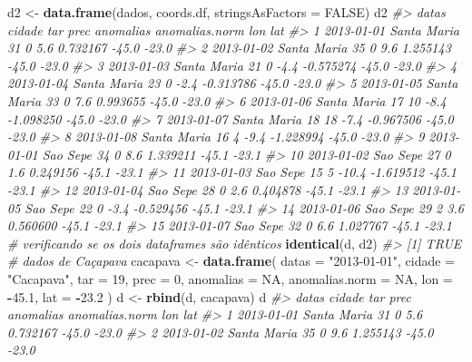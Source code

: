 \documentclass[]{book}
\newenvironment{Shaded}{\begin{snugshade}}{\end{snugshade}}
\newcommand{\KeywordTok}[1]{\textcolor[rgb]{0.13,0.29,0.53}{\textbf{#1}}}
\newcommand{\DataTypeTok}[1]{\textcolor[rgb]{0.13,0.29,0.53}{#1}}
\newcommand{\DecValTok}[1]{\textcolor[rgb]{0.00,0.00,0.81}{#1}}
\newcommand{\FloatTok}[1]{\textcolor[rgb]{0.00,0.00,0.81}{#1}}
\newcommand{\StringTok}[1]{\textcolor[rgb]{0.31,0.60,0.02}{#1}}
\newcommand{\CommentTok}[1]{\textcolor[rgb]{0.56,0.35,0.01}{\textit{#1}}}
\newcommand{\OtherTok}[1]{\textcolor[rgb]{0.56,0.35,0.01}{#1}}
\newcommand{\OperatorTok}[1]{\textcolor[rgb]{0.81,0.36,0.00}{\textbf{#1}}}
\newcommand{\NormalTok}[1]{#1}
\begin{document}
\begin{Shaded}
\begin{Highlighting}[]
\NormalTok{d2 <-}\StringTok{ }\KeywordTok{data.frame}\NormalTok{(dados, coords.df, }\DataTypeTok{stringsAsFactors =} \OtherTok{FALSE}\NormalTok{)}
\NormalTok{d2}
\CommentTok{#>         datas      cidade tar prec anomalias anomalias.norm   lon   lat}
\CommentTok{#> 1  2013-01-01 Santa Maria  31    0       5.6       0.732167 -45.0 -23.0}
\CommentTok{#> 2  2013-01-02 Santa Maria  35    0       9.6       1.255143 -45.0 -23.0}
\CommentTok{#> 3  2013-01-03 Santa Maria  21    0      -4.4      -0.575274 -45.0 -23.0}
\CommentTok{#> 4  2013-01-04 Santa Maria  23    0      -2.4      -0.313786 -45.0 -23.0}
\CommentTok{#> 5  2013-01-05 Santa Maria  33    0       7.6       0.993655 -45.0 -23.0}
\CommentTok{#> 6  2013-01-06 Santa Maria  17   10      -8.4      -1.098250 -45.0 -23.0}
\CommentTok{#> 7  2013-01-07 Santa Maria  18   18      -7.4      -0.967506 -45.0 -23.0}
\CommentTok{#> 8  2013-01-08 Santa Maria  16    4      -9.4      -1.228994 -45.0 -23.0}
\CommentTok{#> 9  2013-01-01    Sao Sepe  34    0       8.6       1.339211 -45.1 -23.1}
\CommentTok{#> 10 2013-01-02    Sao Sepe  27    0       1.6       0.249156 -45.1 -23.1}
\CommentTok{#> 11 2013-01-03    Sao Sepe  15    5     -10.4      -1.619512 -45.1 -23.1}
\CommentTok{#> 12 2013-01-04    Sao Sepe  28    0       2.6       0.404878 -45.1 -23.1}
\CommentTok{#> 13 2013-01-05    Sao Sepe  22    0      -3.4      -0.529456 -45.1 -23.1}
\CommentTok{#> 14 2013-01-06    Sao Sepe  29    2       3.6       0.560600 -45.1 -23.1}
\CommentTok{#> 15 2013-01-07    Sao Sepe  32    0       6.6       1.027767 -45.1 -23.1}
\CommentTok{# verificando se os dois dataframes são idênticos}
\KeywordTok{identical}\NormalTok{(d, d2)}
\CommentTok{#> [1] TRUE}
\CommentTok{# dados de Caçapava}
\NormalTok{cacapava <-}\StringTok{ }\KeywordTok{data.frame}\NormalTok{(}
  \DataTypeTok{datas =} \StringTok{"2013-01-01"}\NormalTok{,}
  \DataTypeTok{cidade =} \StringTok{"Cacapava"}\NormalTok{,}
  \DataTypeTok{tar =} \DecValTok{19}\NormalTok{,}
  \DataTypeTok{prec =} \DecValTok{0}\NormalTok{,}
  \DataTypeTok{anomalias =} \OtherTok{NA}\NormalTok{,}
  \DataTypeTok{anomalias.norm =} \OtherTok{NA}\NormalTok{,}
  \DataTypeTok{lon =} \OperatorTok{-}\FloatTok{45.1}\NormalTok{,}
  \DataTypeTok{lat =} \OperatorTok{-}\FloatTok{23.2}
\NormalTok{)}
\NormalTok{d <-}\StringTok{ }\KeywordTok{rbind}\NormalTok{(d, cacapava)}
\NormalTok{d}
\CommentTok{#>         datas      cidade tar prec anomalias anomalias.norm   lon   lat}
\CommentTok{#> 1  2013-01-01 Santa Maria  31    0       5.6       0.732167 -45.0 -23.0}
\CommentTok{#> 2  2013-01-02 Santa Maria  35    0       9.6       1.255143 -45.0 -23.0}

\end{Highlighting}
\end{Shaded}
\end{document}
